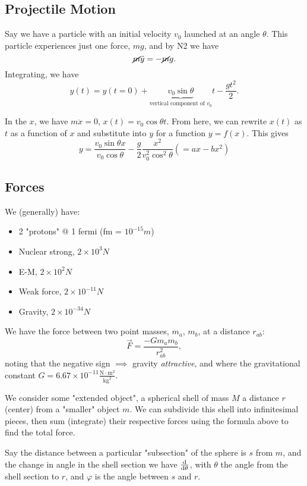 \documentclass[12pt]{article}
\begin{document}
\subsection{Projectile Motion}
Say we have a particle with an initial velocity $v_0$ launched at an angle $\theta$. This particle experiences just one force, $mg$, and by N2 we have \[\cancel{m} \ddot{y} = -\cancel{m}g.\] Integrating, we have \[y(t) = y(t=0) + \underbrace{v_0 \sin \theta}_{\text{vertical component of $v_0$}} t - \frac{g t^2}{2}.\]

In the $x$, we have $m \ddot{x} = 0$, $x(t) = v_0 \cos \theta t$. From here, we can rewrite $x(t)$ as $t$ as a function of $x$ and substitute into $y$ for a function $y = f(x)$. This gives \[
y = \frac{v_0 \sin \theta x}{v_0 \cos \theta} - \frac{g}{2} \frac{x^2}{v_0^2 \cos^2 \theta} (= ax - bx^2)  
\]

\subsection{Forces}

We (generally) have:
\begin{itemize}
  \item 2 "protons" @ 1 fermi (fm = $10^{-15} m$)
  \item Nuclear strong, $2 \times 10^3 N$
  \item E-M, $2 \times 10^2 N$
  \item Weak force, $2 \times 10^{-11} N$
  \item Gravity, $2 \times 10^{-34} N$
\end{itemize}
We have the force between two point masses, $m_a$, $m_b$, at a distance $r_{ab}$:
\[\vec{F} = \frac{- G m_a m_b}{r^2_{ab}},\] noting that the negative sign $\implies$ gravity \textit{attractive}, and where the gravitational constant $G = 6.67 \times 10^{-11} \frac{\text{N} \cdot \text{m}^2}{\text{kg}^2}$.

We consider some "extended object", a spherical shell of mass $M$ a distance $r$ (center) from a "smaller" object $m$. We can subdivide this shell into infinitesimal pieces, then sum (integrate) their respective forces using the formula above to find the total force.

Say the distance between a particular "subsection" of the sphere is $s$ from $m$, and the change in angle in the shell section we have $\dv{\theta}$, with $\theta$ the angle from the shell section to $r$, and $\varphi$ is the angle between $s$ and $r$.
\end{document}
